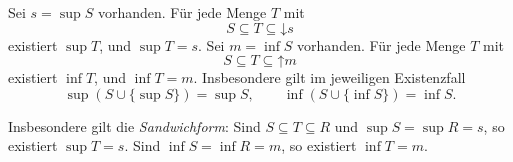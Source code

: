 \begin{theorem}
\label{b13guide:thm:sandwich}
Sei $s=\sup S$ vorhanden. Für jede Menge $T$ mit
\[
 S\subseteq T\subseteq\mathord\downarrow s
\]
existiert $\sup T$, und $\sup T=s$.
Sei $m=\inf S$ vorhanden. Für jede Menge $T$ mit
\[
 S\subseteq T\subseteq\mathord\uparrow m
\]
existiert $\inf T$, und $\inf T=m$.
Insbesondere gilt im jeweiligen Existenzfall
\[
 \sup(S\cup\{\sup S\})=\sup S,\qquad
 \inf(S\cup\{\inf S\})=\inf S.
\]

Insbesondere gilt die \emph{Sandwichform}: Sind
$S\subseteq T\subseteq R$ und $\sup S=\sup R=s$,
so existiert $\sup T=s$. Sind $\inf S=\inf R=m$,
so existiert $\inf T=m$.

\end{theorem}

